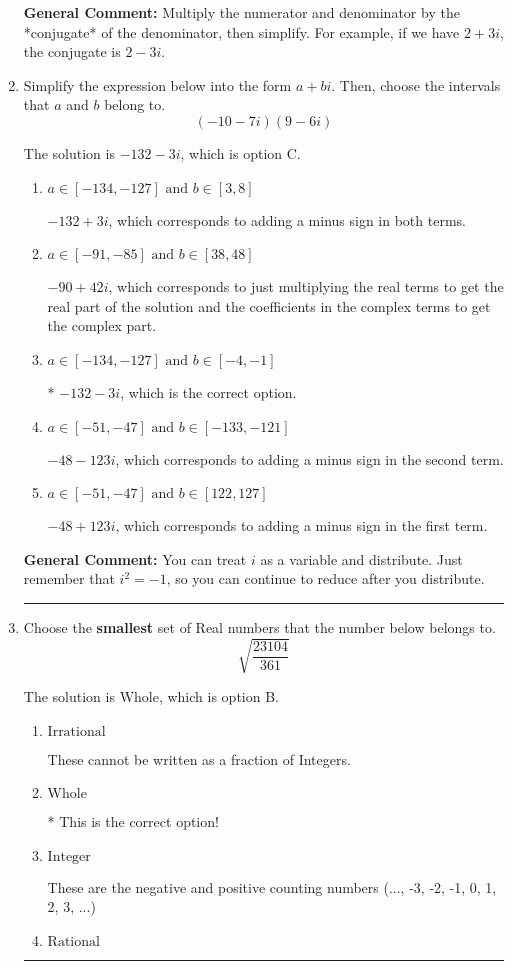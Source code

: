\documentclass{extbook}[14pt]
\newcommand{\litem}[1]{\item #1

\rule{\textwidth}{0.4pt}}
\begin{document}
\begin{enumerate}
{\textbf{General Comment:} Multiply the numerator and denominator by the *conjugate* of the denominator, then simplify. For example, if we have $2+3i$, the conjugate is $2-3i$.
}
\litem{
Simplify the expression below into the form $a+bi$. Then, choose the intervals that $a$ and $b$ belong to.
\[ (-10 - 7 i)(9 - 6 i) \]

The solution is \( -132 - 3 i \), which is option C.\begin{enumerate}[label=\Alph*.]
\item \( a \in [-134, -127] \text{ and } b \in [3, 8] \)

 $-132 + 3 i$, which corresponds to adding a minus sign in both terms.
\item \( a \in [-91, -85] \text{ and } b \in [38, 48] \)

 $-90 + 42 i$, which corresponds to just multiplying the real terms to get the real part of the solution and the coefficients in the complex terms to get the complex part.
\item \( a \in [-134, -127] \text{ and } b \in [-4, -1] \)

* $-132 - 3 i$, which is the correct option.
\item \( a \in [-51, -47] \text{ and } b \in [-133, -121] \)

 $-48 - 123 i$, which corresponds to adding a minus sign in the second term.
\item \( a \in [-51, -47] \text{ and } b \in [122, 127] \)

 $-48 + 123 i$, which corresponds to adding a minus sign in the first term.
\end{enumerate}

\textbf{General Comment:} You can treat $i$ as a variable and distribute. Just remember that $i^2=-1$, so you can continue to reduce after you distribute.
}
\litem{
Choose the \textbf{smallest} set of Real numbers that the number below belongs to.
\[ \sqrt{\frac{23104}{361}} \]

The solution is \( \text{Whole} \), which is option B.\begin{enumerate}[label=\Alph*.]
\item \( \text{Irrational} \)

These cannot be written as a fraction of Integers.
\item \( \text{Whole} \)

* This is the correct option!
\item \( \text{Integer} \)

These are the negative and positive counting numbers (..., -3, -2, -1, 0, 1, 2, 3, ...)
\item \( \text{Rational} \)


\end{enumerate}}
\end{enumerate}
\end{document}

